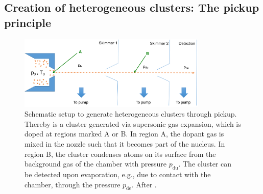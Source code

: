 \subsection{Creation of heterogeneous clusters: The pickup principle}\label{sec:heterogeneous-cluster}
\begin{figure}
	\centering
		\includegraphics[width=0.80\textwidth]{images/pick-up.png}
	\caption[Schematic of a pickup (gas-)source.]{Schematic setup to generate heterogeneous clusters through pickup. Thereby is a cluster generated via supersonic gas expansion, which is doped at regions marked A or B. In region A, the dopant gas is mixed in the nozzle such that it becomes part of the nucleus. In region B, the cluster condenses atoms on its surface from the background gas of the chamber with pressure $p_{\text{du}}$. The cluster can be detected upon evaporation, e.g., due to contact with the chamber, through the pressure $p_{\text{de}}$. After \citep{Gough-1985-JChemPhys,Haberland-1994-Springer}.}
	\label{fig:pickupPrinciple}
\end{figure}
